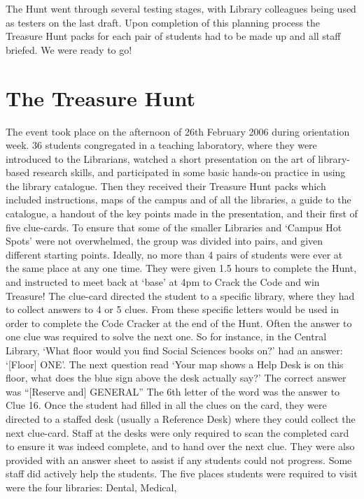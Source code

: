 The Hunt went through several testing stages, with Library colleagues being used as 
testers on the last draft. Upon completion of this planning process the Treasure Hunt 
packs for each pair of students had to be made up and all staff briefed. We were ready to 
go! 

\section{The Treasure Hunt}

The event took place on the afternoon of 26th February 2006 during orientation week. 36 
students congregated in a teaching laboratory, where they were introduced to the 
Librarians, watched a short presentation on the art of library-based research skills, and 
participated in some basic hands-on practice in using the library catalogue. Then they 
received their Treasure Hunt packs which included instructions, maps of the campus and 
of all the libraries, a guide to the catalogue, a handout of the key points made in the 
presentation, and their first of five clue-cards. To ensure that some of the smaller Libraries 
and ‘Campus Hot Spots’ were not overwhelmed, the group was divided into pairs, and 
given different starting points. Ideally, no more than 4 pairs of students were ever at the 
same place at any one time. They were given 1.5 hours to complete the Hunt, and 
instructed to meet back at ‘base’ at 4pm to Crack the Code and win Treasure! 
The clue-card directed the student to a specific library, where they had to collect answers 
to 4 or 5 clues. From these specific letters would be used in order to complete the Code 
Cracker at the end of the Hunt. Often the answer to one clue was required to solve the 
next one. So for instance, in the Central Library, ‘What floor would you find Social 
Sciences books on?’ had an answer: ‘[Floor] ONE’. The next question read ‘Your map 
shows a Help Desk is on this floor, what does the blue sign above the desk actually say?’ 
The correct answer was “[Reserve and] GENERAL” The 6th letter of the word was the 
answer to Clue 16. Once the student had filled in all the clues on the card, they were 
directed to a staffed desk (usually a Reference Desk) where they could collect the next 
clue-card. Staff at the desks were only required to scan the completed card to ensure it 
was indeed complete, and to hand over the next clue. They were also provided with an 
answer sheet to assist if any students could not progress. Some staff did actively help the 
students. 
The five places students were required to visit were the four libraries: Dental, Medical, 
